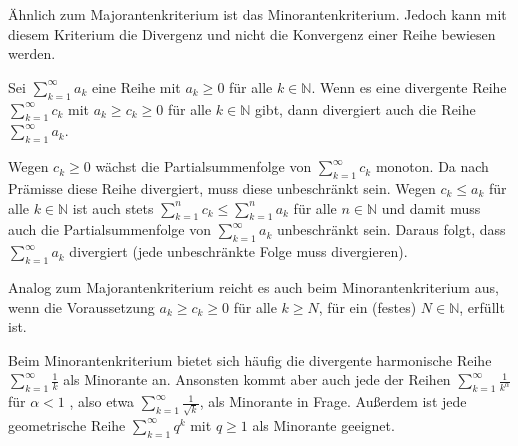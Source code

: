 \documentclass[fontsize=9pt,
               parskip=half-,
               DIV=14,
               listof=chapterentry,
               tocflat]{scrbook}
\begin{document}
Ähnlich zum Majorantenkriterium ist das Minorantenkriterium. Jedoch kann mit diesem Kriterium die Divergenz und nicht die Konvergenz einer Reihe bewiesen werden.

\begin{theorem*}[Minorantenkriterium]
Sei $\sum _{k=1}^{\infty }a_{k}$ eine Reihe mit $a_{k}\geq 0$ für alle $k\in \mathbb {N} $. Wenn es eine divergente Reihe $\sum _{k=1}^{\infty }c_{k}$ mit $a_{k}\geq c_{k}\geq 0$ für alle $k\in \mathbb {N} $ gibt, dann divergiert auch die Reihe $\sum _{k=1}^{\infty }a_{k}$.

\end{theorem*}

\begin{proof*}[Minorantenkriterium]
Wegen $c_{k}\geq 0$ wächst die Partialsummenfolge von $\sum _{k=1}^{\infty }c_{k}$ monoton. Da nach Prämisse diese Reihe divergiert, muss diese unbeschränkt sein. Wegen $c_{k}\leq a_{k}$ für alle $k\in \mathbb {N} $ ist auch stets $\sum _{k=1}^{n}c_{k}\leq \sum _{k=1}^{n}a_{k}$ für alle $n\in \mathbb {N} $ und damit muss auch die Partialsummenfolge von $\sum _{k=1}^{\infty }a_{k}$ unbeschränkt sein. Daraus folgt, dass $\sum _{k=1}^{\infty }a_{k}$ divergiert (jede unbeschränkte Folge muss divergieren).

\end{proof*}

\begin{hint*}
Analog zum Majorantenkriterium reicht es auch beim Minorantenkriterium aus, wenn die Voraussetzung $a_{k}\geq c_{k}\geq 0$ für alle $k\geq N$, für ein (festes) $N\in \mathbb {N} $, erfüllt ist.

\end{hint*}

\begin{hint*}
Beim Minorantenkriterium bietet sich häufig die divergente harmonische Reihe $\sum _{k=1}^{\infty }{\tfrac {1}{k}}$ als Minorante an. Ansonsten kommt aber auch jede der Reihen $\sum _{k=1}^{\infty }{\tfrac {1}{k^{\alpha }}}$ für $\alpha <1$ , also etwa $\sum _{k=1}^{\infty }{\tfrac {1}{\sqrt {k}}}$, als Minorante in Frage. Außerdem ist jede geometrische Reihe $\sum _{k=1}^{\infty }q^{k}$ mit $q\geq 1$ als Minorante geeignet.

\end{hint*}
\end{document}
